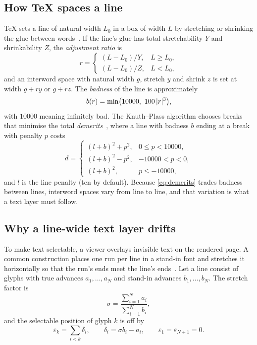 \subsection{How \TeX{} spaces a line}

\TeX{} sets a line of natural width $L_0$ in a box of width $L$ by stretching or
shrinking the glue between words~\cite{knuth1984}. If the line's glue has total
stretchability $Y$ and shrinkability $Z$, the \emph{adjustment ratio} is
\begin{equation}
  r =
  \begin{cases}
    (L - L_0)/Y, & L \ge L_0,\\
    (L - L_0)/Z, & L < L_0,
  \end{cases}
  \label{eq:ratio}
\end{equation}
and an interword space with natural width $g$, stretch $y$ and shrink $z$ is
set at width $g + r y$ or $g + r z$. The \emph{badness} of the line is
approximately
\begin{equation}
  b(r) = \min\bigl(10000,\ 100\,\lvert r\rvert^{3}\bigr),
  \label{eq:badness}
\end{equation}
with $10000$ meaning infinitely bad. The Knuth--Plass algorithm chooses breaks
that minimise the total \emph{demerits}~\cite{knuth1981}, where a line with
badness $b$ ending at a break with penalty $p$ costs
\begin{equation}
  d =
  \begin{cases}
    (l + b)^{2} + p^{2}, & 0 \le p < 10000,\\
    (l + b)^{2} - p^{2}, & -10000 < p < 0,\\
    (l + b)^{2}, & p \le -10000,
  \end{cases}
  \label{eq:demerits}
\end{equation}
and $l$ is the line penalty (ten by default). Because \cref{eq:demerits}
trades badness between lines, interword spaces vary from line to line, and
that variation is what a text layer must follow.

\subsection{Why a line-wide text layer drifts}

To make text selectable, a viewer overlays invisible text on the rendered page.
A common construction places one run per line in a stand-in font and stretches
it horizontally so that the run's ends meet the line's ends~\cite{pdfjs}. Let a
line consist of glyphs with true advances $a_1, \dots, a_N$ and stand-in
advances $b_1, \dots, b_N$. The stretch factor is
\begin{equation}
  \sigma = \frac{\sum_{i=1}^{N} a_i}{\sum_{i=1}^{N} b_i},
\end{equation}
and the selectable position of glyph $k$ is off by
\begin{equation}
  \varepsilon_k = \sum_{i<k} \delta_i, \qquad
  \delta_i = \sigma b_i - a_i, \qquad
  \varepsilon_1 = \varepsilon_{N+1} = 0 .
  \label{eq:drift}
\end{equation}

